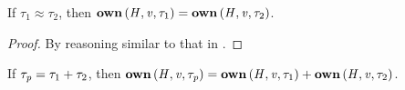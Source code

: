 \begin{lemma} %
  \label{lem:ownequiv-preserv}
  If $\tau_{{\mathrm{1}}}  \approx  \tau_{{\mathrm{2}}}$, then $\mathbf{own} \, (  \mathit{H}  ,  \mathit{v}  ,  \tau_{{\mathrm{1}}}  )  =  \mathbf{own} \, (  \mathit{H}  ,  \mathit{v}  ,  \tau_{{\mathrm{2}}}  )$.
\end{lemma}
\begin{proof}
  By reasoning similar to that in .
\end{proof}

\begin{lemma} %
  \label{lem:ownadd}
  If $\tau_{\mathit{p}}  =  \tau_{{\mathrm{1}}}  +  \tau_{{\mathrm{2}}}$, then $\mathbf{own} \, (  \mathit{H}  ,  \mathit{v}  ,  \tau_{\mathit{p}}  )  =  \mathbf{own} \, (  \mathit{H}  ,  \mathit{v}  ,  \tau_{{\mathrm{1}}}  )  +  \mathbf{own} \, (  \mathit{H}  ,  \mathit{v}  ,  \tau_{{\mathrm{2}}}  )$.
\end{lemma}

